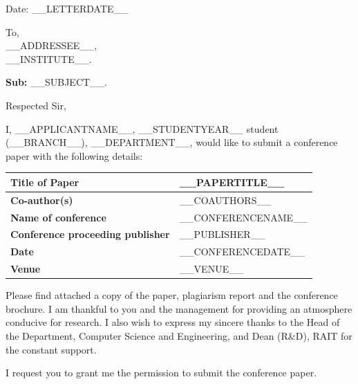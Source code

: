 \documentclass[11pt]{article}
\newcommand{\LetterDate}{__LETTERDATE__}
\newcommand{\Institute}{__INSTITUTE__}
\newcommand{\Addressee}{__ADDRESSEE__}
\newcommand{\SubjectLine}{__SUBJECT__}
\newcommand{\ApplicantName}{__APPLICANTNAME__}
\newcommand{\StudentYear}{__STUDENTYEAR__}
\newcommand{\Branch}{__BRANCH__}
\newcommand{\Department}{__DEPARTMENT__}
\newcommand{\PaperTitle}{__PAPERTITLE__}
\newcommand{\CoAuthors}{__COAUTHORS__}
\newcommand{\ConferenceName}{__CONFERENCENAME__}
\newcommand{\Publisher}{__PUBLISHER__}
\newcommand{\ConferenceDate}{__CONFERENCEDATE__}
\newcommand{\Venue}{__VENUE__}
\begin{document}
\thispagestyle{empty}

\hfill Date: \LetterDate

\vspace{1em}

\noindent To,\\
\Addressee,\\
\Institute.

\vspace{0.7em}

\noindent\textbf{Sub:} \SubjectLine.

\vspace{0.7em}

\noindent Respected Sir,

\vspace{0.4em}

\noindent I, \ApplicantName, \StudentYear{} student (\Branch), \Department,
would like to submit a conference paper with the following details:

\vspace{0.6em}

\noindent\renewcommand{\arraystretch}{1.2}%
\begin{tabularx}{\textwidth}{|L{0.32\textwidth}|X|}
\hline
\textbf{Title of Paper} & \PaperTitle \\ \hline
\textbf{Co-author(s)} & \CoAuthors \\ \hline
\textbf{Name of conference} & \ConferenceName \\ \hline
\textbf{Conference proceeding publisher} & \Publisher \\ \hline
\textbf{Date} & \ConferenceDate \\ \hline
\textbf{Venue} & \Venue \\ \hline
\end{tabularx}

\vspace{0.8em}

\noindent Please find attached a copy of the paper, plagiarism report and the
conference brochure. I am thankful to you and the management for providing an
atmosphere conducive for research. I also wish to express my sincere thanks to
the Head of the Department, Computer Science and Engineering, and Dean (R\&D),
RAIT for the constant support.

\vspace{0.4em}

\noindent I request you to grant me the permission to submit the conference paper.

\vspace{0.7em}
\end{document}
